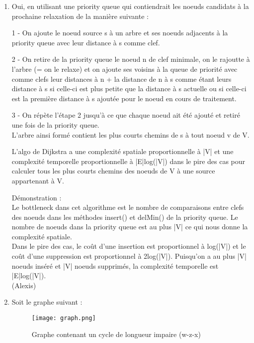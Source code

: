 \documentclass[11pt]{article}
\begin{document}
\begin{enumerate}
\item Oui, en utilisant une priority queue qui contiendrait les noeuds candidats à la prochaine
relaxation de la manière suivante :\\
\par 1 - On ajoute le noeud source s à un arbre et ses noeuds adjacents à la priority 
queue avec leur distance à s comme clef.\\
\par 2 - On retire de la priority queue le noeud n de clef minimale, on le rajoutte
 à l'arbre (= on le relaxe) et on ajoute ses voisins à la queue de priorité avec comme
 clefs leur distances à n + la distance de n à s comme étant leurs distance à s si 
 celle-ci est plus petite que la distance à s actuelle ou si celle-ci est la première
 distance à s ajoutée pour le noeud en cours de traitement.\\
\par 3 - On répète l'étape 2 jusqu'à ce que chaque noeud ait été ajouté et retiré une fois
 de la priority queue.\\
L'arbre ainsi formé contient les plus courts chemins de s à tout noeud v de V.\\
\par L'algo de Dijkstra a une complexité spatiale proportionnelle à |V| et une complexité
 temporelle proportionnelle à |E|log(|V|) dans le pire des cas pour calculer tous les 
 plus courts chemins des noeuds de V à une source appartenant à V.
\par Démonstration :\\
Le bottleneck dans cet algorithme est le nombre de comparaisons entre clefs des noeuds
 dans les méthodes insert() et delMin() de la priority queue. Le nombre de noeuds dans 
 la priority queue est au plus |V| ce qui nous donne la complexité spatiale.\\
 Dans le pire des cas, le coût d'une insertion est proportionnel à log(|V|) et le coût
 d'une suppression est proportionnel à 2log(|V|). Puisqu'on a au plus |V| noeuds inséré
 et |V| noeuds supprimés, la complexité temporelle est |E|log(|V|).\\

(Alexis)\\

\item Soit le graphe suivant :\\

\begin{figure}[h!]
    \center
    \texttt{[image: graph.png]}
    \caption{Graphe contenant un cycle de longueur impaire (w-z-x)}
\end{figure}


\end{enumerate}
\end{document}
